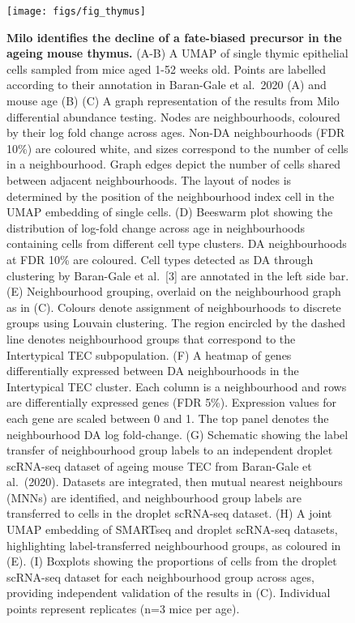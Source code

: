 \documentclass[
  10pt,
]{article}
\begin{document}
\begin{figure}[ht]
\texttt{[image: figs/fig\_thymus]} \caption{\textbf{Milo identifies the decline of a fate-biased precursor in the ageing mouse thymus.}
(A-B) A UMAP of single thymic epithelial cells sampled from mice aged 1-52 weeks old. Points are labelled according to their annotation in Baran-Gale et al.~2020 (A) and mouse age (B)
(C) A graph representation of the results from Milo differential abundance testing. Nodes are neighbourhoods, coloured by their log fold change across ages. Non-DA neighbourhoods (FDR 10\%) are coloured white, and sizes correspond to the number of cells in a neighbourhood. Graph edges depict the number of cells shared between adjacent neighbourhoods. The layout of nodes is determined by the position of the neighbourhood index cell in the UMAP embedding of single cells.
(D) Beeswarm plot showing the distribution of log-fold change across age in neighbourhoods containing cells from different cell type clusters. DA neighbourhoods at FDR 10\% are coloured. Cell types detected as DA through clustering by Baran-Gale et al.~{[}3{]} are annotated in the left side bar.
(E) Neighbourhood grouping, overlaid on the neighbourhood graph as in (C). Colours denote assignment of neighbourhoods to discrete groups using Louvain clustering. The region encircled by the dashed line denotes neighbourhood groups that correspond to the Intertypical TEC subpopulation.
(F) A heatmap of genes differentially expressed between DA neighbourhoods in the Intertypical TEC cluster. Each column is a neighbourhood and rows are differentially expressed genes (FDR 5\%). Expression values for each gene are scaled between 0 and 1. The top panel denotes the neighbourhood DA log fold-change.
(G) Schematic showing the label transfer of neighbourhood group labels to an independent droplet scRNA-seq dataset of ageing mouse TEC from Baran-Gale et al.~(2020). Datasets are integrated, then mutual nearest neighbours (MNNs) are identified, and neighbourhood group labels are transferred to cells in the droplet scRNA-seq dataset.
(H) A joint UMAP embedding of SMARTseq and droplet scRNA-seq datasets, highlighting label-transferred neighbourhood groups, as coloured in (E).
(I) Boxplots showing the proportions of cells from the droplet scRNA-seq dataset for each neighbourhood group across ages, providing independent validation of the results in (C). Individual points represent replicates (n=3 mice per age).}\label{fig:fig-4}
\end{figure}
\end{document}
